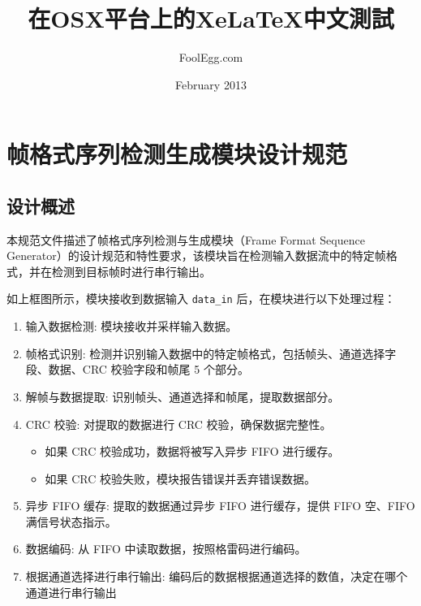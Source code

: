 \documentclass[12pt,]{article}
\title{\huge 在OSX平台上的XeLaTeX中文測試} %
\author{FoolEgg.com} 		%
\date{February 2013} 		%
\author{}
\date{}
\begin{document}
\hypertarget{ux5e27ux683cux5f0fux5e8fux5217ux68c0ux6d4bux751fux6210ux6a21ux5757ux8bbeux8ba1ux89c4ux8303}{%
\section{帧格式序列检测生成模块设计规范}\label{ux5e27ux683cux5f0fux5e8fux5217ux68c0ux6d4bux751fux6210ux6a21ux5757ux8bbeux8ba1ux89c4ux8303}}

\tableofcontents
\newpage

\hypertarget{ux8bbeux8ba1ux6982ux8ff0}{%
\subsection{设计概述}\label{ux8bbeux8ba1ux6982ux8ff0}}

本规范文件描述了帧格式序列检测与生成模块（Frame Format Sequence
Generator）的设计规范和特性要求，该模块旨在检测输入数据流中的特定帧格式，并在检测到目标帧时进行串行输出。

\begin{figure}[h!]
  
\end{figure}

如上框图所示，模块接收到数据输入 \texttt{data\_in}
后，在模块进行以下处理过程：

\begin{enumerate}
\def\labelenumi{\arabic{enumi}.}
\item
  输入数据检测: 模块接收并采样输入数据。
\item
  帧格式识别:
  检测并识别输入数据中的特定帧格式，包括帧头、通道选择字段、数据、CRC
  校验字段和帧尾 5 个部分。
\item
  解帧与数据提取: 识别帧头、通道选择和帧尾，提取数据部分。
\item
  CRC 校验: 对提取的数据进行 CRC 校验，确保数据完整性。

  \begin{itemize}
  \item
    如果 CRC 校验成功，数据将被写入异步 FIFO 进行缓存。
  \item
    如果 CRC 校验失败，模块报告错误并丢弃错误数据。
  \end{itemize}
\item
  异步 FIFO 缓存: 提取的数据通过异步 FIFO 进行缓存，提供 FIFO 空、FIFO
  满信号状态指示。
\item
  数据编码: 从 FIFO 中读取数据，按照格雷码进行编码。
\item
  根据通道选择进行串行输出:
  编码后的数据根据通道选择的数值，决定在哪个通道进行串行输出
\end{enumerate}
\end{document}

